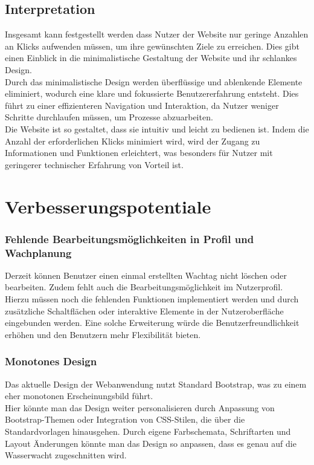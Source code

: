 \documentclass[fontsize=12pt,openright,oneside,paper=a4,BCOR=1cm]{scrbook}
\begin{document}
\subsection{Interpretation}
Insgesamt kann festgestellt werden dass Nutzer der Website nur geringe Anzahlen an Klicks aufwenden müssen, um ihre gewünschten Ziele zu erreichen. Dies gibt einen Einblick in die minimalistische Gestaltung der Website und ihr schlankes Design. \\ 
Durch das minimalistische Design werden überflüssige und ablenkende Elemente eliminiert, wodurch eine klare und fokussierte Benutzererfahrung entsteht. Dies führt zu einer effizienteren Navigation und Interaktion, da Nutzer weniger Schritte durchlaufen müssen, um Prozesse abzuarbeiten. \\
Die Website ist so gestaltet, dass sie intuitiv und leicht zu bedienen ist. Indem die Anzahl der erforderlichen Klicks minimiert wird, wird der Zugang zu Informationen und Funktionen erleichtert, was besonders für Nutzer mit geringerer technischer Erfahrung von Vorteil ist. 

\section{Verbesserungspotentiale}

\subsubsection{Fehlende Bearbeitungsmöglichkeiten in Profil und Wachplanung}
Derzeit können Benutzer einen einmal erstellten Wachtag nicht löschen oder bearbeiten. Zudem fehlt auch die Bearbeitungsmöglichkeit im Nutzerprofil. \\ 
Hierzu müssen noch die fehlenden Funktionen implementiert werden und durch zusätzliche Schaltflächen oder interaktive Elemente in der Nutzeroberfläche eingebunden werden. Eine solche Erweiterung würde die Benutzerfreundlichkeit erhöhen und den Benutzern mehr Flexibilität bieten.

\subsubsection{Monotones Design} 
Das aktuelle Design der Webanwendung nutzt Standard Bootstrap, was zu einem eher monotonen Erscheinungsbild führt. \\ 
Hier könnte man das Design weiter personalisieren durch Anpassung von Bootstrap-Themen oder Integration von CSS-Stilen, die über die Standardvorlagen hinausgehen. Durch eigene Farbschemata, Schriftarten und Layout Änderungen könnte man das Design so anpassen, dass es genau auf die Wasserwacht zugeschnitten wird.
\end{document}
